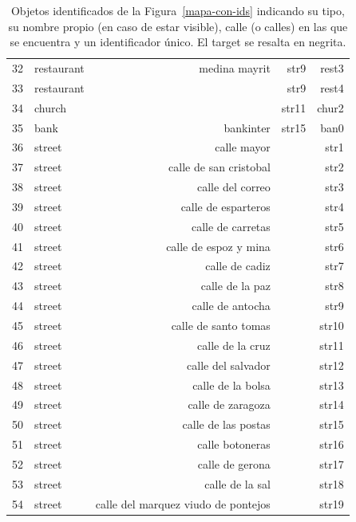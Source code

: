 \begin{table}[H]
{\begin{center}
\begin{tabular}{|l|l|r|r|r|}
32&restaurant & medina mayrit & str9 & rest3\\
33&restaurant & & str9 & rest4\\
34&church & & str11 & chur2\\
35&bank & bankinter & str15 & ban0\\
36&street & calle mayor & & str1 \\
37&street & calle de san cristobal & & str2\\
38&street & calle del correo & & str3\\
39&street & calle de esparteros & & str4\\
40&street & calle de carretas & & str5\\
41&street & calle de espoz y mina & & str6\\
42&street & calle de cadiz & & str7\\
43&street & calle de la paz & & str8\\
44&street & calle de antocha & & str9\\
45&street & calle de santo tomas & & str10\\
46&street & calle de la cruz & & str11\\
47&street & calle del salvador & & str12\\
48&street & calle de la bolsa & & str13\\
49&street & calle de zaragoza & & str14\\
50&street & calle de las postas & & str15\\
51&street & calle botoneras & & str16\\
52&street & calle de gerona & & str17\\
53&street & calle de la sal & & str18\\
54&street & calle del marquez viudo de pontejos & & str19\\
\hline
\end{tabular}
\caption{Objetos identificados de la Figura~\ref{mapa-con-ids} indicando su tipo, su nombre propio (en caso de estar visible), calle (o calles) en las que se encuentra y un identificador \'unico. El target se resalta en negrita.\label{tabla-ids}}
\end{center}
}
\end{table}



